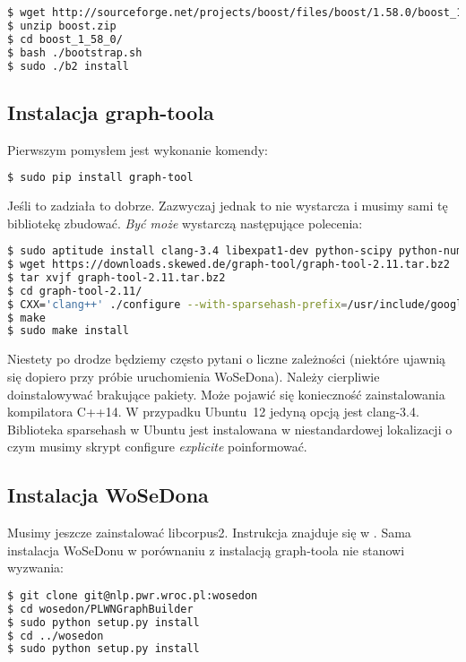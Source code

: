 \documentclass[10pt,a4paper]{article}
\begin{document}
\begin{lstlisting}[language=bash]
$ wget http://sourceforge.net/projects/boost/files/boost/1.58.0/boost_1_58_0.zip/download -O boost.zip
$ unzip boost.zip
$ cd boost_1_58_0/
$ bash ./bootstrap.sh
$ sudo ./b2 install
\end{lstlisting}

\subsection{Instalacja graph-toola}
Pierwszym pomysłem jest wykonanie komendy:

\begin{lstlisting}[language=bash]
$ sudo pip install graph-tool
\end{lstlisting}

Jeśli to zadziała to dobrze. Zazwyczaj jednak to nie wystarcza i musimy sami tę bibliotekę zbudować. \textit{Być może} wystarczą następujące polecenia:

\begin{lstlisting}[language=bash]
$ sudo aptitude install clang-3.4 libexpat1-dev python-scipy python-numpy libcgal-dev libsparsehash-dev python-cairo python-matplotlib libgraphviz-dev
$ wget https://downloads.skewed.de/graph-tool/graph-tool-2.11.tar.bz2
$ tar xvjf graph-tool-2.11.tar.bz2
$ cd graph-tool-2.11/
$ CXX='clang++' ./configure --with-sparsehash-prefix=/usr/include/google/
$ make
$ sudo make install
\end{lstlisting}

Niestety po drodze będziemy często pytani o liczne zależności (niektóre ujawnią się dopiero przy próbie uruchomienia WoSeDona). Należy cierpliwie doinstalowywać brakujące pakiety. Może pojawić się konieczność zainstalowania kompilatora C++14. W przypadku Ubuntu~12 jedyną opcją jest clang-3.4. Biblioteka sparsehash w Ubuntu jest instalowana w niestandardowej lokalizacji o czym musimy skrypt configure \textit{explicite} poinformować.

\subsection{Instalacja WoSeDona}
Musimy jeszcze zainstalować libcorpus2. Instrukcja znajduje się w \cite{libc}. Sama instalacja WoSeDonu w porównaniu z instalacją graph-toola nie stanowi wyzwania:

\begin{lstlisting}[language=bash]
$ git clone git@nlp.pwr.wroc.pl:wosedon
$ cd wosedon/PLWNGraphBuilder
$ sudo python setup.py install
$ cd ../wosedon
$ sudo python setup.py install
\end{lstlisting}
\end{document}
